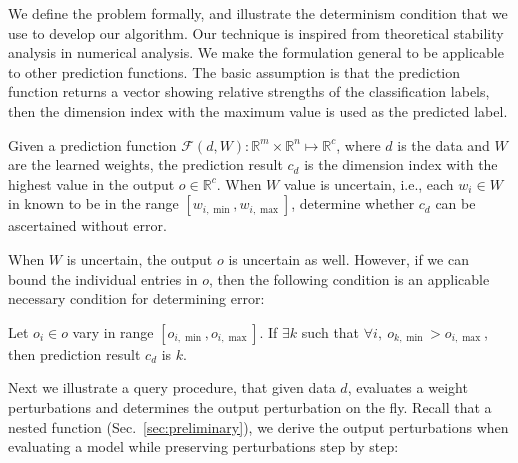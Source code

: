 \documentclass[conference]{IEEEtran}
\begin{document}
We define the problem formally, and illustrate the determinism condition that we use to develop
our algorithm. %
Our technique is
inspired from theoretical stability analysis in numerical analysis. We make the
formulation  general to be applicable to other prediction functions. The
basic assumption is that the prediction function returns a vector showing relative
strengths of the classification labels, then the dimension index with the maximum
value is used as the predicted label. 

\begin{problem}
Given a prediction function $\mathcal{F}(d, W): \mathbb{R}^m \times \mathbb{R}^n \mapsto \mathbb{R}^c$, where $d$ is the data and $W$ are the learned weights, the prediction result $c_d$ is the dimension index with the highest value in the output $o \in \mathbb{R}^c$. When $W$ value is uncertain, i.e., each $w_i \in W$ in known to be in the range $[w_{i,\min }, w_{i, \max}]$, determine whether $c_d$ can be ascertained without error.
\end{problem}


When $W$ is uncertain, the output $o$ is uncertain as well. However, if we can bound the individual entries in $o$, then the following condition is an applicable necessary condition for determining error: 


\begin{lemma}
\label{lm:error_determinism}
Let $o_i \in o$ vary in range $[o_{i,\min}, o_{i,\max}]$. If $\exists k$ such that $\forall i,\ o_{k,\min} > o_{i,\max}$, then prediction result $c_d$ is $k$.
\end{lemma}

Next we illustrate a query procedure, that given data $d$, evaluates a \dnn\with weight perturbations and determines the output perturbation on the fly. Recall that \dnn\is a nested function (Sec.~\ref{sec:preliminary}), 
we derive the output perturbations when evaluating a model while preserving perturbations step by step:
\end{document}
